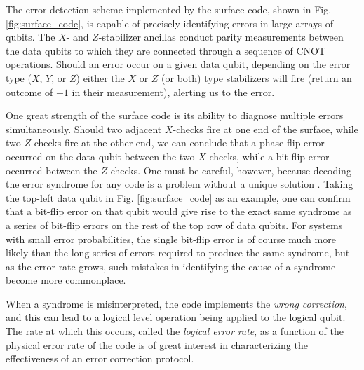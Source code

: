 The error detection scheme implemented by the surface code, shown in Fig.
\ref{fig:surface_code}, is capable of precisely identifying errors in large
arrays of qubits. The $X$- and $Z$-stabilizer ancillas conduct parity
measurements between the data qubits to which they are connected through a
sequence of CNOT operations. Should an error occur on a given data qubit,
depending on the error type ($X$, $Y$, or $Z$) either the $X$ or $Z$ (or both)
type stabilizers will fire (return an outcome of $-1$ in their measurement),
alerting us to the error.

One great strength of the surface code is its ability to diagnose multiple
errors simultaneously. Should two adjacent $X$-checks fire at one end of the
surface, while two $Z$-checks fire at the other end, we can conclude that a
phase-flip error occurred on the data qubit between the two $X$-checks, while a
bit-flip error occurred between the $Z$-checks. One must be careful, however,
because decoding the error syndrome for any code is a problem without a unique
solution \cite{terhal15}. Taking the top-left data qubit in Fig. \ref{fig:surface_code} as an
example, one can confirm that a bit-flip error on that qubit would give rise to
the exact same syndrome as a series of bit-flip errors on the rest of the top
row of data qubits. For systems with small error probabilities, the single
bit-flip error is of course much more likely than the long series of errors
required to produce the same syndrome, but as the error rate grows, such
mistakes in identifying the cause of a syndrome become more commonplace. 

When a syndrome is misinterpreted, the code implements the \textit{wrong
  correction}, and this can lead to a logical level operation being applied to
the logical qubit. The rate at which this occurs, called the \textit{logical
  error rate}, as a function of the physical error rate of the code is of great
interest in characterizing the effectiveness of an error correction protocol.


